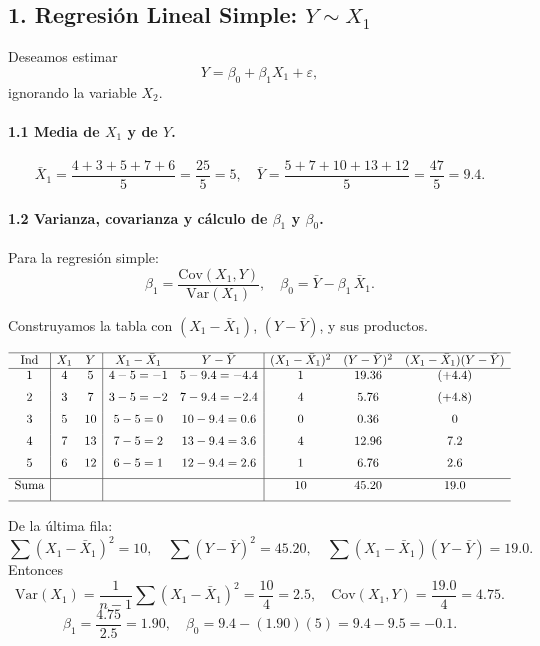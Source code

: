 \documentclass[10pt,a4paper]{article}
\begin{document}
\begin{enumerate}
\subsection*{1. Regresi\'on Lineal Simple: $Y \sim X_1$}

Deseamos estimar 
\[
Y = \beta_0 + \beta_1 X_1 + \varepsilon,
\]
ignorando la variable $X_2$.

\paragraph{1.1 Media de $X_1$ y de $Y$.}

\[
\bar{X}_1
= \frac{4+3+5+7+6}{5}
= \frac{25}{5}
= 5,
\quad
\bar{Y}
= \frac{5+7+10+13+12}{5}
= \frac{47}{5}
= 9.4.
\]

\paragraph{1.2 Varianza, covarianza y c\'alculo de $\beta_1$ y $\beta_0$.}

Para la regresión simple:
\[
\beta_1
= \frac{\mathrm{Cov}(X_1,Y)}{\mathrm{Var}(X_1)},
\quad
\beta_0
= \bar{Y} - \beta_1\,\bar{X}_1.
\]

Construyamos la tabla con $(X_1-\bar{X}_1)$, $(Y-\bar{Y})$, y sus productos.

\[
\begin{array}{c|cc|cc|ccc}
\hline
\text{Ind} & X_1 & Y 
& X_1-\bar{X}_1 & Y-\bar{Y}
& (X_1 - \bar{X}_1)^2 & (Y - \bar{Y})^2
& (X_1-\bar{X}_1)(Y-\bar{Y})\\
\hline
1 & 4 & 5 
& 4-5=-1
& 5-9.4=-4.4
& 1
& 19.36
& (+4.4) \\[6pt]
2 & 3 & 7
& 3-5=-2
& 7-9.4=-2.4
& 4
& 5.76
& (+4.8) \\[6pt]
3 & 5 & 10
& 5-5=0
& 10-9.4=0.6
& 0
& 0.36
& 0 \\[6pt]
4 & 7 & 13
& 7-5=2
& 13-9.4=3.6
& 4
& 12.96
& 7.2 \\[6pt]
5 & 6 & 12
& 6-5=1
& 12-9.4=2.6
& 1
& 6.76
& 2.6 \\[6pt]
\hline
\text{Suma} & & & & 
& 10
& 45.20
& 19.0 \\[6pt]
\hline
\end{array}
\]

De la última fila:
\[
\sum (X_1-\bar{X}_1)^2 = 10,
\quad
\sum (Y - \bar{Y})^2 = 45.20,
\quad
\sum (X_1-\bar{X}_1)(Y-\bar{Y}) = 19.0.
\]
Entonces
\[
\mathrm{Var}(X_1)
= \frac{1}{n-1}\sum (X_1-\bar{X}_1)^2
= \frac{10}{4}
= 2.5,
\quad
\mathrm{Cov}(X_1,Y)
= \frac{19.0}{4}
= 4.75.
\]
\[
\beta_1
= \frac{4.75}{2.5}
= 1.90,
\quad
\beta_0
= 9.4 - (1.90)(5)
= 9.4 - 9.5
= -0.1.
\]


\end{enumerate}
\end{document}
